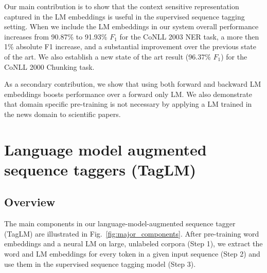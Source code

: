 \documentclass[11pt,a4paper]{article}
\newcommand\wadelete[1]{}
\begin{document}
Our main contribution is to show that the context sensitive
representation captured in the LM embeddings is useful in the
supervised sequence tagging setting.
When we include the LM embeddings in our system overall performance increases from 90.87\% to 91.93\% $F_1$ for the CoNLL 2003 NER task, a more then 1\% absolute F1 increase,
and a substantial improvement over the previous state of the art.
We also establish
a new state of the art result (96.37\% $F_1$) for the CoNLL 2000 Chunking task.

As a secondary contribution, we show that using both forward and backward LM embeddings boosts performance over a forward only LM. We also demonstrate that domain specific pre-training is not necessary by applying a LM trained in the news domain to scientific papers.




\section{Language model augmented sequence taggers (TagLM)}


\subsection{Overview}
The main components in our language-model-augmented sequence tagger (TagLM) are illustrated in Fig.~\ref{fig:major_components}. 
After pre-training word embeddings and a neural LM on large, unlabeled corpora (Step 1), we extract the word and LM embeddings for every token in a given input sequence (Step 2)
and use them in the supervised sequence tagging model (Step 3).
\end{document}

